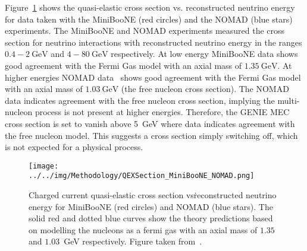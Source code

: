 
Figure~\ref{fig:QEXSection_katori} shows the quasi-elastic cross
section vs. reconstructed neutrino energy for data taken with the
MiniBooNE (red circles) and the NOMAD (blue stars) experiments. The
MiniBooNE and NOMAD experiments measured the cross section for
neutrino interactions with reconstructed neutrino energy in the ranges
$0.4 - 2~\text{GeV}$ and $4 - 80~\text{GeV}$ respectively.
At low energy MiniBooNE data shows good agreement with the Fermi Gas
model with an axial mass of $1.35~\text{GeV}$. At higher energies
NOMAD data~\cite{lyubushkin2009study} shows good agreement with the
Fermi Gas model with an axial 
mass of $1.03~\text{GeV}$ (the free nucleon cross section). 
The NOMAD data indicates agreement with the free nucleon cross
section, implying the multi-nucleon process is not present at higher
energies. 
Therefore, the GENIE MEC cross section is set to vanish
above 5~GeV where data indicates agreement with the free nucleon
model. 
This suggests a cross section simply switching off, which is not
expected for a physical process.

\begin{figure}[h]
  \centering
\texttt{[image: ../../img/Methodology/QEXSection\_MiniBooNE\_NOMAD.png]}
  \caption{
    Charged current quasi-elastic cross section vs\. reconstructed
    neutrino energy for MiniBooNE (red circles) and NOMAD (blue
    stars). The solid red and dotted blue curves show the theory
    predictions based on modelling the nucleons as a fermi gas with an
    axial mass of $1.35$ and $1.03$~GeV respectively. Figure taken
    from~\cite{katori2008measurement}.
  } 
  \label{fig:QEXSection_katori}
\end{figure}



